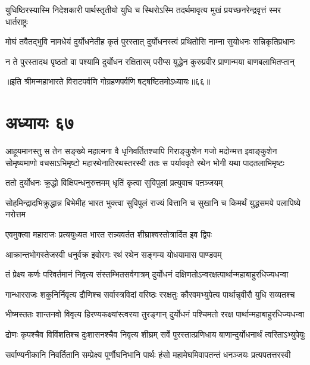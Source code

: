 \twolineshloka
{युधिष्ठिरस्यास्मि निदेशकारी पार्थस्तृतीयो युधि च स्थिरोऽस्मि}
{तदर्थमावृत्य मुखं प्रयच्छनरेन्द्रवृत्तं स्मर धार्तराष्ट्रः}


\twolineshloka
{मोघं तवैतद्भुवि नामधेयं दुर्योधनेतीह कृतं पुरस्तात्}
{दुर्योधनस्त्वं प्रथितोसि नाम्ना सुयोधनः सन्निकृतिप्रधानः}



\twolineshloka
{न ते पुरस्तादथ पृष्ठतो वा पश्यामि दुर्योधन रक्षितारम्}
{परीप्स युद्धेन कुरुप्रवीर प्राणान्मया बाणबलाभितप्तान्}

॥इति श्रीमन्महाभारते विराटपर्वणि गोग्रहणपर्वणि षट्षष्टितमोऽध्यायः॥६६॥

\chapter{अध्यायः ६७}
\onelineshloka
{आहूयमानस्तु स तेन सङ्ख्ये महात्मना वै धृनिवर्तितश्चापि गिराङ्कुशेन गजो मदोन्मत्त इवाङ्कुशेन}
\twolineshloka
{सोमृष्यमाणो वचसाऽभिमृष्टो महारथेनातिरथस्तरस्वी}
{ततः स पर्याववृते रथेन भोगी यथा पादतलाभिमृष्टः}


\twolineshloka
{ततो दुर्योधनः क्रुद्धो विक्षिपन्धनुरुत्तमम्}
{धृतिं कृत्वा सुविपुलां प्रत्युवाच पऩञ्जयम्}


\threelineshloka
{सोहमिन्द्रादभिक्रुद्धान्न बिभेमीह भारत}
{भुक्त्वा सुविपुलं राज्यं वित्तानि च सुखानि च}
{किमर्थं युद्धसमये पलापिष्ये नरोत्तम}


\twolineshloka
{एवमुक्त्वा महाराजः प्रत्ययुध्यत भारत}
{सन्न्यवर्तत शीघ्राश्वस्तोत्रार्दित इव द्विपः}


\twolineshloka
{आक्रान्तभोगस्तेजस्वी धनुर्वक्र इवोरगः}
{रथं रथेन सङ्गम्य योधयामास पाण्डवम्}


\twolineshloka
{तं प्रेक्ष्य कर्णः परिवर्तमानं निवृत्य संस्तम्भितसर्वगात्रम्}
{दुर्योधनं दक्षिणतोऽन्वरक्षत्पार्थान्महाबाहुरधिज्यधन्वा}


\twolineshloka
{गान्धारराजः शकुनिर्निवृत्य द्रौणिश्च सर्वास्त्रविदां वरिष्ठः}
{ररक्षतुः कौरवमभ्युपेत्य पार्थान्नृवीरौ युधि सव्यतश्च}


\twolineshloka
{भीष्मस्ततः शान्तनवो विवृत्य हिरण्यकक्ष्यांस्त्वरया तुरङ्गान्}
{दुर्योधनं पश्चिमतो ररक्ष पार्थान्महाबाहुरधिज्यधन्वा}


\twolineshloka
{द्रोणः कृपश्चैव विविंशतिश्च दुःशासनश्चैव निवृत्य शीघ्रम्}
{सर्वे पुरस्तात्प्रणिधाय बाणान्दुर्योधनार्थं त्वरिताऽभ्युपेयुः}


\twolineshloka
{सर्वाण्यनीकानि निवर्तितानि सम्प्रेक्ष्य पूर्णौघनिभानि पार्थः}
{हंसो महामेघमिवापतन्तं धनञ्जयः प्रत्यपतत्तरस्वी}


